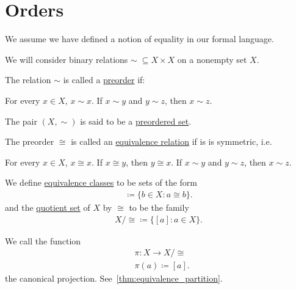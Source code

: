 \section{Orders}\label{sec:orders}

We assume we have defined a notion of equality in our formal language.

\begin{definition}\label{def:order}
  We will consider binary relations $\sim\; \subseteq X \times X$ on a nonempty set $X$.

  \begin{defenum}
    \item\label{def:order/preorder}\cite{nLab:preorder} The relation $\sim$ is called a \ul{preorder} if:
    \begin{description}
       For every $x \in X$, $x \sim x$.
       If $x \sim y$ and $y \sim z$, then $x \sim z$.
    \end{description}

    The pair $(X, \sim)$ is said to be a \ul{preordered set}.

    \item\label{def:order/equivalence}\cite[56]{Enderton1977} The preorder $\cong$ is called an \ul{equivalence relation} if is is symmetric, i.e.
    \begin{description}
       For every $x \in X$, $x \cong x$.
       If $x \cong y$, then $y \cong x$.
       If $x \sim y$ and $y \sim z$, then $x \sim z$.
    \end{description}

    We define \ul{equivalence classes} to be sets of the form
    \begin{align*}
      [a] \coloneqq \{ b \in X \colon a \cong b \}.
    \end{align*}
    and the \ul{quotient set} of $X$ by $\cong$ to be the family
    \begin{align*}
      X / \cong \coloneqq \{ [a] \colon a \in X \}.
    \end{align*}

    We call the function
    \begin{align*}
      &\pi: X \to X / \cong \\
      &\pi(a) \coloneqq [a].
    \end{align*}
    the canonical projection. See~\cref{thm:equivalence_partition}.


\end{defenum}
\end{definition}
